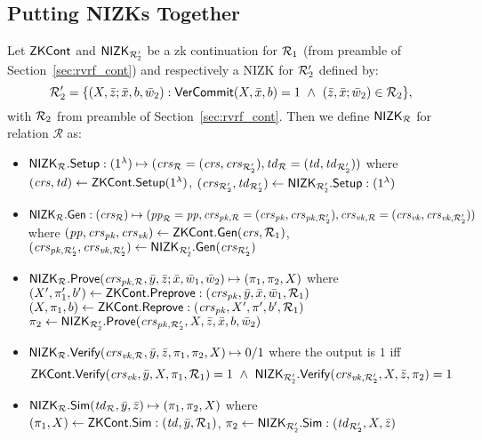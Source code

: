 \subsection{Putting NIZKs Together}
Let $\ZKCont$ and $\nizktwo$ be a zk continuation for $\relone$ (from preamble of Section~\ref{sec:rvrf_cont}) and respectively a NIZK 
for $\reltwo'$ defined by:
$$\reltwo' = \{(X, \barz; \barx, b, \baromega_2): \VerifyCom(X, \barx, b) =1 \ \wedge \ (\barz, \barx; \baromega_2) \in \reltwo \},$$
\noindent with $\reltwo$ from preamble of Section~\ref{sec:rvrf_cont}. Then we define $\nizkR$ for relation $\mathcal{R}$ as:
\begin{itemize}
\item $\nizkR.\Setup: (1^{\lambda}) \mapsto (\crsR = (\crs,\crstwo), \twR = (\tw, \twtwo))$ where \\
$(\crs, \tw) \leftarrow \ZKCont.\Setup(1^{\lambda})$, $(\crstwo, \twtwo) \leftarrow \nizktwo.\Setup: (1^{\lambda})$

\item $\nizkR.\Gen: (\crsR) \mapsto (\ppR = \pp, \crspkR = (\crspk,\crspktwo), \crsvkR = (\crsvk,\crsvktwo))$ where 
$(\pp, \crspk, \crsvk) \leftarrow \ZKCont.\Gen(\crs, \relone)$, \\ $(\crspktwo, \crsvktwo) \leftarrow \nizktwo.\Gen(\crstwo)$ 

\item $\nizkR.\Prove(\crspkR,\bary, \barz; \barx, \baromega_1, \baromega_2 ) \mapsto (\pi_1, \pi_2, X)$ where \\
$(X', \pi'_1, b')\leftarrow \ZKCont.\Preprove:(\crspk, \bar{y}, \bar{x}, \baromega_1, \relone)$ \\
$(X, \pi_1, b) \leftarrow \ZKCont.\Reprove: (\crspk, X', \pi', b', \relone)$ \\
$ \pi_2 \leftarrow \nizktwo.\Prove(\crspktwo, X, \barz, \barx, b, \baromega_2)$ 

\item $\nizkR.\Verify(\crsvkR,\bary, \barz, \pi_1, \pi_2, X) \mapsto 0/1$ where the output is $1$ iff 
$$\ZKCont.\Verify(\crsvk, \bar{y}, X, \pi_1, \relone) = 1 \  \wedge \ \nizktwo.\Verify(\crsvktwo, X, \barz, \pi_2) =1$$

\item $\nizkR.\Sim(\twR, \bary, \barz) \mapsto (\pi_1, \pi_2, X)$ where \\
$(\pi_1, X) \leftarrow \ZKCont.\Sim: (\tw, \bary, \relone)$, $\pi_2 \leftarrow \nizktwo.\Sim: (\twtwo, X, \barz)$ 
 \end{itemize}
 
